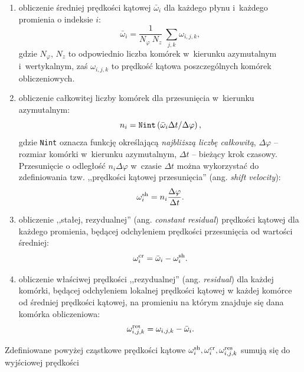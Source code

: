 \begin{enumerate}
   \item obliczenie średniej prędkości kątowej $\bar{\omega}_i$ dla każdego
      płynu i~każdego promienia o indeksie $i$:
      \begin{equation}
         \bar{\omega}_i = \frac{1}{N_\varphi~N_z} ~ \sum_{j,k} \omega_{i,j,k},
      \end{equation}
      gdzie $N_\varphi,\,N_z$ to odpowiednio liczba komórek w~kierunku
      azymutalnym i~wertykalnym, zaś $\omega_{i,j,k}$ to prędkość kątowa
      poszczególnych komórek obliczeniowych.
   \item  obliczenie całkowitej liczby komórek dla przesunięcia w~kierunku
      azymutalnym:
      \begin{equation}
         n_i = {\tt Nint} \left( \bar{\omega}_i \Delta t/\Delta \varphi \right),
      \end{equation}
      gdzie {\tt Nint} oznacza funkcję określającą \emph{najbliższą liczbę
      całkowitą}, $\Delta\varphi$ -- rozmiar komórki w~kierunku azymutalnym,
      $\Delta t$ -- bieżący krok czasowy. Przesunięcie o odległość $n_i \Delta
      \varphi$ w~czasie $\Delta t$ można wykorzystać do
      zdefiniowania tzw. ,,prędkości kątowej przesunięcia'' (ang. \emph{shift
      velocity}):
      \begin{equation}
         \omega_i^{\rm sh} = n_i \frac{\Delta \varphi}{\Delta t}.
      \end{equation}
   \item obliczenie ,,stałej, rezydualnej'' (ang. \emph{constant residual})
      prędkości kątowej  dla każdego promienia, będącej odchyleniem prędkości
      przesunięcia od wartości średniej:
      \begin{equation}
         \omega_i^{\rm cr}= \bar{\omega}_i - \omega_i^{\rm sh}.
      \end{equation}
   \item obliczenie właściwej prędkości ,,rezydualnej'' (ang. \emph{residual})
      dla każdej komórki, będącej odchyleniem lokalnej prędkości kątowej w
      każdej komórce od średniej prędkości kątowej, na promieniu na którym
      znajduje się dana komórka obliczeniowa:
      \begin{equation}
         \omega_{i,j,k}^{\rm res} = \omega_{i,j,k} - \bar{\omega}_i.
      \end{equation}
\end{enumerate}
%
Zdefiniowane powyżej cząstkowe prędkości kątowe $\omega_i^{\rm sh},
\omega_i^{\rm cr}, \omega_{i,j,k}^{\rm res}$ sumują się do wyjściowej prędkości
